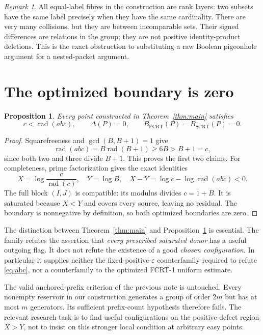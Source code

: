 \documentclass[11pt,a4paper]{article}
\newtheorem{proposition}[theorem]{Proposition}
\theoremstyle{definition}
\theoremstyle{remark}
\newtheorem{remark}[theorem]{Remark}
\DeclareMathOperator{\rad}{rad}
\newcommand{\FCRT}{B_{\mathrm{FCRT}}}
\newcommand{\SCRT}{B_{\mathrm{SCRT}}}
\begin{document}
\begin{remark}
All equal-label fibres in the construction are rank layers: two subsets
have the same label precisely when they have the same cardinality.
There are very many collisions, but they are between incomparable sets.
Their signed differences are relations in the group; they are not positive
identity-product deletions. This is the exact obstruction to substituting a
raw Boolean pigeonhole argument for a nested-packet argument.
\end{remark}

\section{The optimized boundary is zero}
\begin{proposition}\label{prop:zero}
Every point constructed in Theorem~\ref{thm:main} satisfies
\[
 c<\rad(abc),\qquad \Delta(P)=0,\qquad
 \FCRT(P)=\SCRT(P)=0.
\]
\end{proposition}
\begin{proof}
Squarefreeness and $\gcd(B,B+1)=1$ give
\[
 \rad(abc)=B\rad(B+1)\ge6B>B+1=c,
\]
since both two and three divide $B+1$. This proves the first two claims.
For completeness, prime factorization gives the exact identities
\[
 X=\log\frac{c}{\rad(c)},\quad Y=\log B,\quad
 X-Y=\log c-\log\rad(abc)<0.
\]
The full block $(I,J)$ is compatible: its modulus divides $c=1+B$.
It is saturated because $X<Y$ and covers every source, leaving no residual.
The boundary is nonnegative by definition, so both optimized boundaries
are zero.
\end{proof}

The distinction between Theorem~\ref{thm:main} and
Proposition~\ref{prop:zero} is essential. The family refutes the assertion
that \emph{every prescribed saturated donor} has a useful outgoing flag.
It does not refute the existence of a good \emph{chosen configuration}.
In particular it supplies neither the fixed-positive-$\varepsilon$
counterfamily required to refute \eqref{eq:abc}, nor a counterfamily to the
optimized FCRT-1 uniform estimate.

The valid anchored-prefix criterion of the previous note is untouched.
Every nonempty reservoir in our construction generates a group of order
$2m$ but has at most $m$ generators. Its sufficient prefix-count hypothesis
therefore fails. The relevant research task is to find useful configurations
on the positive-defect region $X>Y$, not to insist on this stronger local
condition at arbitrary easy points.
\end{document}

